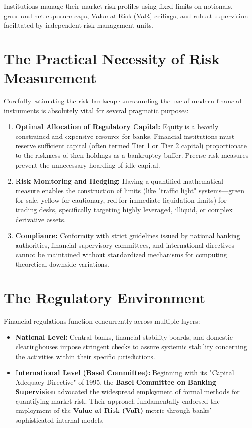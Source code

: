 Institutions manage their market risk profiles using fixed limits on notionals, gross and net exposure caps, Value at Risk (VaR) ceilings, and robust supervision facilitated by independent risk management units.

\section{The Practical Necessity of Risk Measurement}

Carefully estimating the risk landscape surrounding the use of modern financial instruments is absolutely vital for several pragmatic purposes:

\begin{enumerate}
    \item \textbf{Optimal Allocation of Regulatory Capital:} Equity is a heavily constrained and expensive resource for banks. Financial institutions must reserve sufficient capital (often termed Tier 1 or Tier 2 capital) proportionate to the riskiness of their holdings as a bankruptcy buffer. Precise risk measures prevent the unnecessary hoarding of idle capital.
    \item \textbf{Risk Monitoring and Hedging:} Having a quantified mathematical measure enables the construction of limits (like "traffic light" systems—green for safe, yellow for cautionary, red for immediate liquidation limits) for trading desks, specifically targeting highly leveraged, illiquid, or complex derivative assets.
    \item \textbf{Compliance:} Conformity with strict guidelines issued by national banking authorities, financial supervisory committees, and international directives cannot be maintained without standardized mechanisms for computing theoretical downside variations.
\end{enumerate}

\section{The Regulatory Environment}

Financial regulations function concurrently across multiple layers:

\begin{itemize}
    \item \textbf{National Level:} Central banks, financial stability boards, and domestic clearinghouses impose stringent checks to assure systemic stability concerning the activities within their specific jurisdictions.
    \item \textbf{International Level (Basel Committee):} Beginning with its "Capital Adequacy Directive" of 1995, the \textbf{Basel Committee on Banking Supervision} advocated the widespread employment of formal methods for quantifying market risk. Their approach fundamentally endorsed the employment of the \textbf{Value at Risk (VaR)} metric through banks' sophisticated internal models.
\end{itemize}


